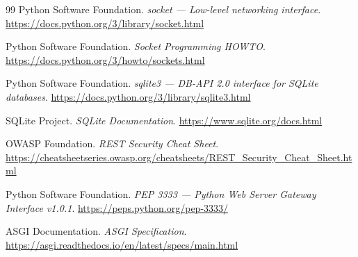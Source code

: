 \begin{thebibliography}{99}
Python Software Foundation.
\emph{socket --- Low-level networking interface}.
\url{https://docs.python.org/3/library/socket.html}

Python Software Foundation.
\emph{Socket Programming HOWTO}.
\url{https://docs.python.org/3/howto/sockets.html}

Python Software Foundation.
\emph{sqlite3 --- DB-API 2.0 interface for SQLite databases}.
\url{https://docs.python.org/3/library/sqlite3.html}

SQLite Project.
\emph{SQLite Documentation}.
\url{https://www.sqlite.org/docs.html}

OWASP Foundation.
\emph{REST Security Cheat Sheet}.
\url{https://cheatsheetseries.owasp.org/cheatsheets/REST_Security_Cheat_Sheet.html}

Python Software Foundation.
\emph{PEP 3333 --- Python Web Server Gateway Interface v1.0.1}.
\url{https://peps.python.org/pep-3333/}

ASGI Documentation.
\emph{ASGI Specification}.
\url{https://asgi.readthedocs.io/en/latest/specs/main.html}

\end{thebibliography}

